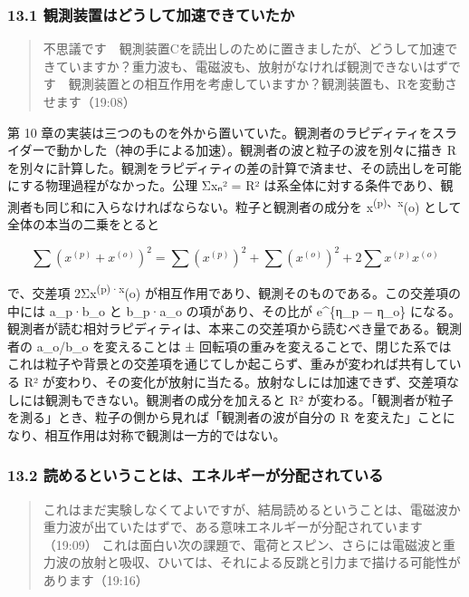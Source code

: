 \documentclass[
  a4paper,
]{ltjsarticle}
\begin{document}
\subsubsection{13.1
観測装置はどうして加速できていたか}\label{ux89b3ux6e2cux88c5ux7f6eux306fux3069ux3046ux3057ux3066ux52a0ux901fux3067ux304dux3066ux3044ux305fux304b}

\begin{quote}
不思議です　観測装置Cを読出しのために置きましたが、どうして加速できていますか？重力波も、電磁波も、放射がなければ観測できないはずです　観測装置との相互作用を考慮していますか？観測装置も、Rを変動させます（19:08）
\end{quote}

第 10
章の実装は三つのものを外から置いていた。観測者のラピディティをスライダーで動かした（神の手による加速）。観測者の波と粒子の波を別々に描き
R
を別々に計算した。観測をラピディティの差の計算で済ませ、その読出しを可能にする物理過程がなかった。公理
Σxₙ² = R²
は系全体に対する条件であり、観測者も同じ和に入らなければならない。粒子と観測者の成分を
x\textsuperscript{(p)、x}(o) として全体の本当の二乗をとると

\[
\sum\left(x^{(p)}+x^{(o)}\right)^2=\sum\left(x^{(p)}\right)^2+\sum\left(x^{(o)}\right)^2+2\sum x^{(p)}x^{(o)}
\]

で、交差項 2Σx\textsuperscript{(p)·x}(o)
が相互作用であり、観測そのものである。この交差項の中には a\_p·b\_o と
b\_p·a\_o の項があり、その比が e\^{}\{η\_p − η\_o\}
になる。観測者が読む相対ラピディティは、本来この交差項から読むべき量である。観測者の
a\_o/b\_o を変えることは ±
回転項の重みを変えることで、閉じた系ではこれは粒子や背景との交差項を通じてしか起こらず、重みが変われば共有している
R²
が変わり、その変化が放射に当たる。放射なしには加速できず、交差項なしには観測もできない。観測者の成分を加えると
R²
が変わる。「観測者が粒子を測る」とき、粒子の側から見れば「観測者の波が自分の
R を変えた」ことになり、相互作用は対称で観測は一方的ではない。

\subsubsection{13.2
読めるということは、エネルギーが分配されている}\label{ux8aadux3081ux308bux3068ux3044ux3046ux3053ux3068ux306fux30a8ux30cdux30ebux30aeux30fcux304cux5206ux914dux3055ux308cux3066ux3044ux308b}

\begin{quote}
これはまだ実験しなくてよいですが、結局読めるということは、電磁波か重力波が出ていたはずで、ある意味エネルギーが分配されています（19:09）
これは面白い次の課題で、電荷とスピン、さらには電磁波と重力波の放射と吸収、ひいては、それによる反跳と引力まで描ける可能性があります（19:16）
\end{quote}
\end{document}
